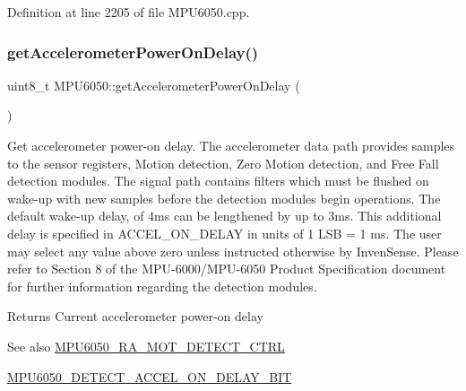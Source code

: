 Definition at line 2205 of file M\+P\+U6050.\+cpp.


\begin{DoxyCode}{0}

\end{DoxyCode}
\mbox{\label{classMPU6050_aae903df2accc687423f9cd0a78f9cd32}} 
\subsubsection{\texorpdfstring{getAccelerometerPowerOnDelay()}{getAccelerometerPowerOnDelay()}}
{\footnotesize\ttfamily uint8\+\_\+t M\+P\+U6050\+::get\+Accelerometer\+Power\+On\+Delay (\begin{DoxyParamCaption}{ }\end{DoxyParamCaption})}

Get accelerometer power-\/on delay. The accelerometer data path provides samples to the sensor registers, Motion detection, Zero Motion detection, and Free Fall detection modules. The signal path contains filters which must be flushed on wake-\/up with new samples before the detection modules begin operations. The default wake-\/up delay, of 4ms can be lengthened by up to 3ms. This additional delay is specified in A\+C\+C\+E\+L\+\_\+\+O\+N\+\_\+\+D\+E\+L\+AY in units of 1 L\+SB = 1 ms. The user may select any value above zero unless instructed otherwise by Inven\+Sense. Please refer to Section 8 of the M\+P\+U-\/6000/\+M\+P\+U-\/6050 Product Specification document for further information regarding the detection modules. \begin{DoxyReturn}{Returns}
Current accelerometer power-\/on delay 
\end{DoxyReturn}
\begin{DoxySeeAlso}{See also}
\mbox{\hyperlink{MPU6050_8h_ae83e3eb48f0803227db54291fdf0ea80}{M\+P\+U6050\+\_\+\+R\+A\+\_\+\+M\+O\+T\+\_\+\+D\+E\+T\+E\+C\+T\+\_\+\+C\+T\+RL}} 

\mbox{\hyperlink{MPU6050_8h_a31babac49d185160595482b1a41a9db3}{M\+P\+U6050\+\_\+\+D\+E\+T\+E\+C\+T\+\_\+\+A\+C\+C\+E\+L\+\_\+\+O\+N\+\_\+\+D\+E\+L\+A\+Y\+\_\+\+B\+IT}} 
\end{DoxySeeAlso}


